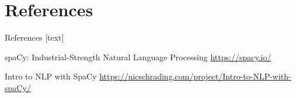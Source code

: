 \documentclass[xcolor=dvipsnames]{beamer}
\begin{document}

\section{References}
\begin{frame}[allowframebreaks]{References}
[text]
 \begin{thebibliography}{99} %
 spaCy: Industrial-Strength Natural Language Processing
\footnotesize \url{https://spacy.io/}

 Intro to NLP with SpaCy
\footnotesize\url{https://nicschrading.com/project/Intro-to-NLP-with-spaCy/}

\end{thebibliography}

\end{frame}

\end{document}
